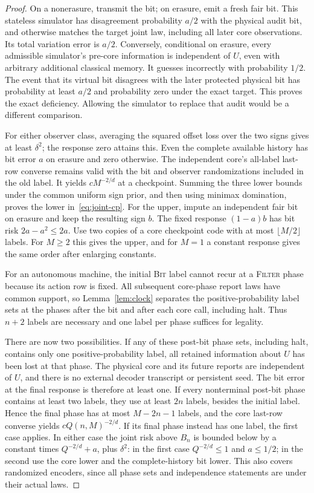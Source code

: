 \begin{proof}
On a nonerasure, transmit the bit; on erasure, emit a fresh fair bit. This stateless simulator has disagreement probability $a/2$ with the physical audit bit, and otherwise matches the target joint law, including all later core observations. Its total variation error is $a/2$. Conversely, conditional on erasure, every admissible simulator's pre-core information is independent of $U$, even with arbitrary additional classical memory. It guesses incorrectly with probability $1/2$. The event that its virtual bit disagrees with the later protected physical bit has probability at least $a/2$ and probability zero under the exact target. This proves the exact deficiency. Allowing the simulator to replace that audit would be a different comparison.

For either observer class, averaging the squared offset loss over the two signs gives at least $\delta^2$; the response zero attains this. Even the complete available history has bit error $a$ on erasure and zero otherwise. The independent core's all-label last-row converse remains valid with the bit and observer randomizations included in the old label. It yields $cM^{-2/d}$ at a checkpoint. Summing the three lower bounds under the common uniform sign prior, and then using minimax domination, proves the lower in~\eqref{eq:joint-cp}. For the upper, impute an independent fair bit on erasure and keep the resulting sign $b$. The fixed response $(1-a)b$ has bit risk $2a-a^2\le2a$. Use two copies of a core checkpoint code with at most $\lfloor M/2\rfloor$ labels. For $M\ge2$ this gives the upper, and for $M=1$ a constant response gives the same order after enlarging constants.

For an autonomous machine, the initial \textsc{Bit} label cannot recur at a \textsc{Filter} phase because its action row is fixed. All subsequent core-phase report laws have common support, so Lemma~\ref{lem:clock} separates the positive-probability label sets at the phases after the bit and after each core call, including halt. Thus $n+2$ labels are necessary and one label per phase suffices for legality.

There are now two possibilities. If any of these post-bit phase sets, including halt, contains only one positive-probability label, all retained information about $U$ has been lost at that phase. The physical core and its future reports are independent of $U$, and there is no external decoder transcript or persistent seed. The bit error at the final response is therefore at least one. If every nonterminal post-bit phase contains at least two labels, they use at least $2n$ labels, besides the initial label. Hence the final phase has at most $M-2n-1$ labels, and the core last-row converse yields $cQ(n,M)^{-2/d}$. If its final phase instead has one label, the first case applies. In either case the joint risk above $B_n$ is bounded below by a constant times $Q^{-2/d}+a$, plus $\delta^2$: in the first case $Q^{-2/d}\le1$ and $a\le1/2$; in the second use the core lower and the complete-history bit lower. This also covers randomized encoders, since all phase sets and independence statements are under their actual laws.


\end{proof}
